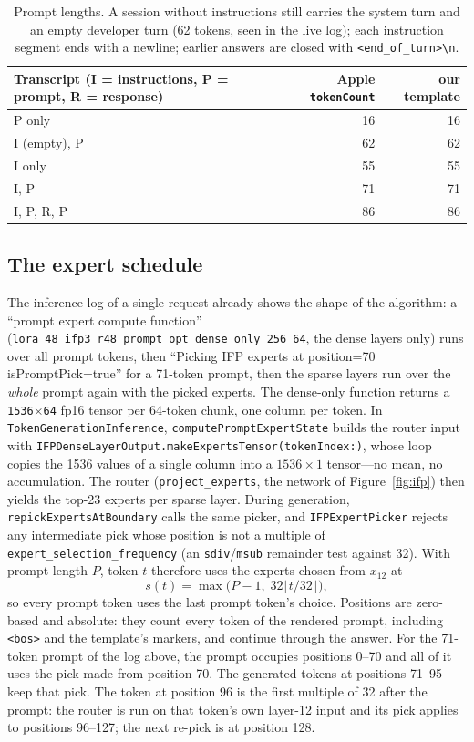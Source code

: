 \documentclass[11pt,reqno]{amsart}
\newcommand{\code}[1]{\texttt{#1}}
\theoremstyle{definition}
\begin{document}
\begin{table}[H]
\centering\small
\begin{tabular}{@{}lrr@{}}
\toprule
Transcript (I = instructions, P = prompt, R = response) & Apple \code{tokenCount} & our template \\
\midrule
P only & 16 & 16 \\
I (empty), P & 62 & 62 \\
I only & 55 & 55 \\
I, P & 71 & 71 \\
I, P, R, P & 86 & 86 \\
\bottomrule
\end{tabular}
\caption{Prompt lengths. A session without instructions still carries the system turn and an empty developer turn (62 tokens, seen in the live log); each instruction segment ends with a newline; earlier answers are closed with \code{<end\_of\_turn>\textbackslash n}.}\label{tab:tc}
\end{table}

\subsection{The expert schedule}
The inference log of a single request already shows the shape of the algorithm: a ``prompt expert compute function'' (\code{lora\_48\_ifp3\_r48\_prompt\_opt\_dense\_only\_256\_64}, the dense layers only) runs over all prompt tokens, then ``Picking IFP experts at position=70 isPromptPick=true'' for a 71-token prompt, then the sparse layers run over the \emph{whole} prompt again with the picked experts. The dense-only function returns a \code{1536}$\times$\code{64} fp16 tensor per 64-token chunk, one column per token. In \code{TokenGenerationInference}, \code{computePromptExpertState} builds the router input with \code{IFPDenseLayerOutput.makeExpertsTensor(tokenIndex:)}, whose loop copies the 1536 values of a single column into a $1536\times1$ tensor---no mean, no accumulation. The router (\code{project\_experts}, the network of Figure~\ref{fig:ifp}) then yields the top-23 experts per sparse layer. During generation, \code{repickExpertsAtBoundary} calls the same picker, and \code{IFPExpertPicker} rejects any intermediate pick whose position is not a multiple of \code{expert\_selection\_frequency} (an \code{sdiv}/\code{msub} remainder test against 32). With prompt length $P$, token $t$ therefore uses the experts chosen from $x_{12}$ at
\[
s(t)=\max\!\big(P-1,\;32\lfloor t/32\rfloor\big),
\]
so every prompt token uses the last prompt token's choice. Positions are zero-based and absolute: they count every token of the rendered prompt, including \code{<bos>} and the template's markers, and continue through the answer. For the 71-token prompt of the log above, the prompt occupies positions 0--70 and all of it uses the pick made from position 70. The generated tokens at positions 71--95 keep that pick. The token at position 96 is the first multiple of 32 after the prompt: the router is run on that token's own layer-12 input and its pick applies to positions 96--127; the next re-pick is at position 128.
\end{document}
